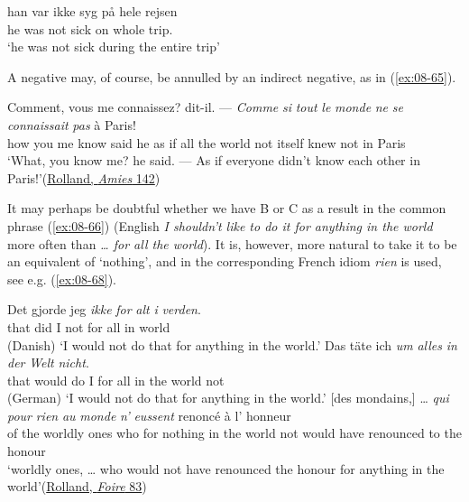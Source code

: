\ea \label{ex:08-64}
\gll han var ikke syg på hele rejsen\\
 he was not sick on whole trip.\DEF{}\\
\glt `he was not sick during the entire trip'
\z

A negative may, of course, be annulled by an indirect negative, as in (\ref{ex:08-65}).\largerpage[1.75]

\ea \label{ex:08-65}
\gll Comment, vous me connaissez? dit-il. --- \emph{Comme} \emph{si} \emph{tout} \emph{le} \emph{monde} \emph{ne} \emph{se} \emph{connaissait} \emph{pas} à Paris!\\
 how you me know {said he} {} as if all the world not itself knew not in Paris\\
\glt `What, you know me? he said. --- As if everyone didn't know each other in Paris!'\hfill(\href{https://www.gutenberg.org/cache/epub/61970/pg61970-images.html}{Rolland, \textit{Amies} 142}) %
\z


It may perhaps be doubtful whether we have B or C as a result in the common phrase (\ref{ex:08-66}) (English \textit{I shouldn't like to do it for anything in the world} more often than \textit{{\dots} for all the world}). It is, however, more natural to take it to be an equivalent of `nothing', and in the corresponding French idiom \textit{rien} is used, see e.g. (\ref{ex:08-68}).

\ea \label{ex:08-66}
\ea{}
\gll Det gjorde jeg \emph{ikke} \emph{for} \emph{alt} \emph{i} \emph{verden}.\\
 that did I not for all in world\\\hfill(Danish)
\glt `I would not do that for anything in the world.'
\ex
\gll Das täte ich \emph{um} \emph{alles} \emph{in} \emph{der} \emph{Welt} \emph{nicht}.\\
 that {would do} I for all in the world not\\\hfill(German)
\glt `I would not do that for anything in the world.'
\z
\ex \label{ex:08-68}
\gll {}[des mondains,] {\dots} \textit{qui} \emph{pour} \emph{rien} \emph{au} \emph{monde} \emph{n'} \emph{eussent} renoncé à l' honneur\\
 {of the} {worldly ones} {} who for nothing {in the} world not {would have} renounced to the honour\\
\glt `worldly ones, {\dots} who would not have renounced the honour for anything in the world'\hfill(\href{https://www.gutenberg.org/cache/epub/61876/pg61876-images.html}{Rolland, \textit{Foire} 83}) %
\z

